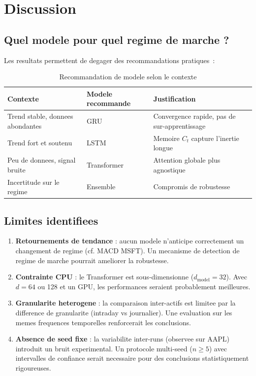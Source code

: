 \documentclass[12pt, a4paper]{article}
\begin{document}
\section{Discussion}

\subsection{Quel modele pour quel regime de marche ?}

Les resultats permettent de degager des recommandations pratiques~:

\begin{table}[H]
\centering
\caption{Recommandation de modele selon le contexte}
\begin{tabular}{lll}
\toprule
\textbf{Contexte} & \textbf{Modele recommande} & \textbf{Justification} \\
\midrule
Trend stable, donnees abondantes & GRU & Convergence rapide, pas de sur-apprentissage \\
Trend fort et soutenu & LSTM & Memoire $C_t$ capture l'inertie longue \\
Peu de donnees, signal bruite & Transformer & Attention globale plus agnostique \\
Incertitude sur le regime & Ensemble & Compromis de robustesse \\
\bottomrule
\end{tabular}
\end{table}

\subsection{Limites identifiees}

\begin{enumerate}
  \item \textbf{Retournements de tendance} : aucun modele n'anticipe correctement un changement de regime (cf. MACD MSFT). Un mecanisme de detection de regime de marche pourrait ameliorer la robustesse.
  \item \textbf{Contrainte CPU} : le Transformer est sous-dimensionne ($d_\text{model} = 32$). Avec $d = 64$ ou 128 et un GPU, les performances seraient probablement meilleures.
  \item \textbf{Granularite heterogene} : la comparaison inter-actifs est limitee par la difference de granularite (intraday vs journalier). Une evaluation sur les memes frequences temporelles renforcerait les conclusions.
  \item \textbf{Absence de seed fixe} : la variabilite inter-runs (observee sur AAPL) introduit un bruit experimental. Un protocole multi-seed ($n \geq 5$) avec intervalles de confiance serait necessaire pour des conclusions statistiquement rigoureuses.
\end{enumerate}
\end{document}
